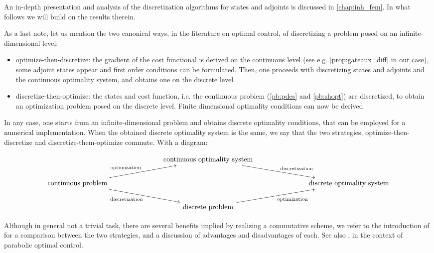 \documentclass[english,a4paper,9pt,oneside]{scrbook}	%
\theoremstyle{break}
\theoremstyle{remark}
\begin{document}
An in-depth presentation and analysis of the discretization algorithms for states and adjoints is discussed in \cref{chap:inh_fem}. In what follows we will build on the results therein.

As a last note, let us mention the two canonical ways, in the literature on optimal control, of discretizing a problem posed on an infinite-dimensional level:

\begin{itemize}
	\item optimize-then-discretize: the gradient of the cost functional is derived on the continuous level (see e.g. \cref{prop:gateaux_diff} in our case), some adjoint states appear and first order conditions can be formulated. Then, one proceeds with discretizing states and adjoints and the continuous optimality system, and obtains one on the discrete level
	\item discretize-then-optimize: the states and cost function, i.e. the continuous problem (\cref{pb:pdes} and \cref{pb:shopt}) are discretized, to obtain an optimization problem posed on the discrete level. Finite dimensional optimality conditions can now be derived
\end{itemize}

In any case, one starts from an infinite-dimensional problem and obtains discrete optimality conditions, that can be employed for a numerical implementation. When the obtained discrete optimality system is the same, we say that the two strategies, optimize-then-discretize and discretize-them-optimize commute. With a diagram:

\[\begin{tikzcd}
	&&& \text{continuous optimality system} \\
	\text{continuous problem} &&&&&& \text{discrete optimality system}  \\
	&&& \text{discrete problem} 
	\arrow["{\text{optimization}}"', from=3-4, to=2-7]
	\arrow["{\text{discretization}}", from=1-4, to=2-7]
	\arrow["{\text{optimization}}", from=2-1, to=1-4]
	\arrow["{\text{discretization}}"', from=2-1, to=3-4]
\end{tikzcd}\]

Although in general not a trivial task, there are several benefits implied by realizing a commutative scheme, we refer to the introduction of \cite{liu} for a comparison between the two strategies, and a discussion of advantages and disadvantages of each. See also \cite{flaig}, in the context of parabolic optimal control.
\end{document}
